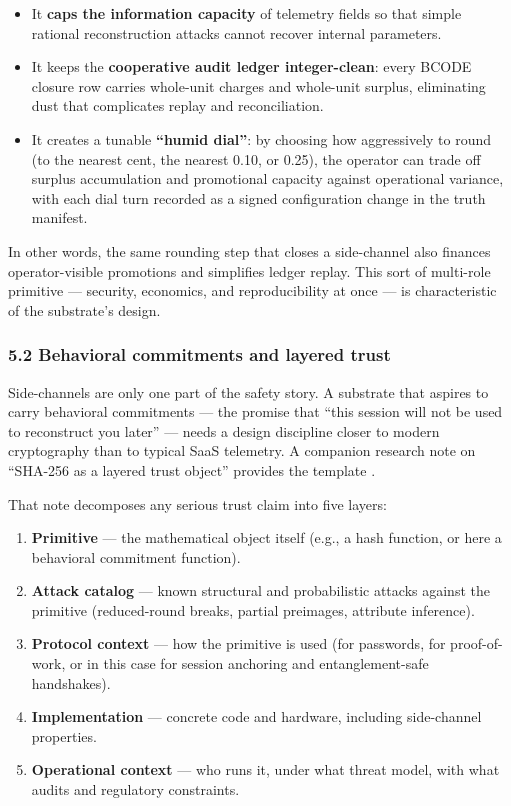 \begin{itemize}
\tightlist
\item
  It \textbf{caps the information capacity} of telemetry fields so that
  simple rational reconstruction attacks cannot recover internal
  parameters.
\item
  It keeps the \textbf{cooperative audit ledger integer-clean}: every
  BCODE closure row carries whole-unit charges and whole-unit surplus,
  eliminating dust that complicates replay and reconciliation.
\item
  It creates a tunable \textbf{``humid dial''}: by choosing how
  aggressively to round (to the nearest cent, the nearest 0.10, or
  0.25), the operator can trade off surplus accumulation and promotional
  capacity against operational variance, with each dial turn recorded as
  a signed configuration change in the truth manifest.
\end{itemize}

In other words, the same rounding step that closes a side-channel also
finances operator-visible promotions and simplifies ledger replay. This
sort of multi-role primitive --- security, economics, and
reproducibility at once --- is characteristic of the substrate's design.

\subsubsection{5.2 Behavioral commitments and layered
trust}\label{behavioral-commitments-and-layered-trust}

Side-channels are only one part of the safety story. A substrate that
aspires to carry behavioral commitments --- the promise that ``this
session will not be used to reconstruct you later'' --- needs a design
discipline closer to modern cryptography than to typical SaaS telemetry.
A companion research note on ``SHA-256 as a layered trust object''
provides the template \citep{wp3_sha256_layered_trust}.

That note decomposes any serious trust claim into five layers:

\begin{enumerate}
\def\labelenumi{\arabic{enumi}.}
\tightlist
\item
  \textbf{Primitive} --- the mathematical object itself (e.g., a hash
  function, or here a behavioral commitment function).
\item
  \textbf{Attack catalog} --- known structural and probabilistic attacks
  against the primitive (reduced-round breaks, partial preimages,
  attribute inference).
\item
  \textbf{Protocol context} --- how the primitive is used (for
  passwords, for proof-of-work, or in this case for session anchoring
  and entanglement-safe handshakes).
\item
  \textbf{Implementation} --- concrete code and hardware, including
  side-channel properties.
\item
  \textbf{Operational context} --- who runs it, under what threat model,
  with what audits and regulatory constraints.
\end{enumerate}


